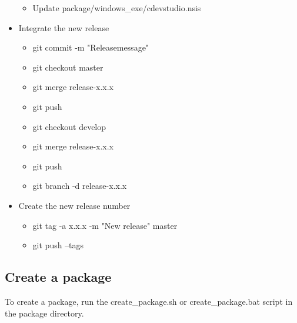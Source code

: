 \documentclass{article}
\begin{document}
\begin{itemize}
\begin{itemize}
		\item Update package/windows_exe/cdevstudio.nsis
	\end{itemize}
	\item Integrate the new release
	\begin{itemize}
		\item git commit -m "Releasemessage"
		\item git checkout master
		\item git merge release-x.x.x
		\item git push
		\item git checkout develop
		\item git merge release-x.x.x
		\item git push
		\item git branch -d release-x.x.x
	\end{itemize}
	\item Create the new release number
	\begin{itemize}
		\item git tag -a x.x.x -m "New release" master
		\item git push --tags
	\end{itemize}
\end{itemize}

\subsection{Create a package}
To create a package, run the create_package.sh or create_package.bat script in the package directory.
\end{document}
